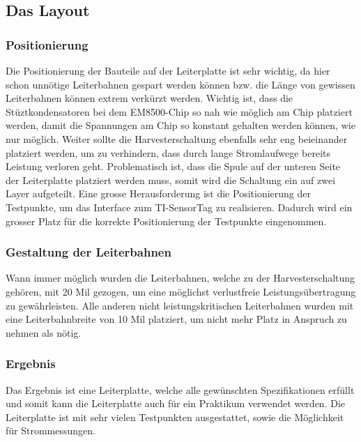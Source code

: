 \subsection{Das Layout}

\subsubsection{Positionierung}
Die Positionierung der Bauteile auf der Leiterplatte ist sehr wichtig, da hier schon unnötige Leiterbahnen gespart werden können bzw. die Länge von gewissen Leiterbahnen können extrem verkürzt werden.
Wichtig ist, dass die Stüztkondensatoren bei dem EM8500-Chip so nah wie möglich am Chip platziert werden, damit die Spannungen am Chip so konstant gehalten werden können, wie nur möglich.
Weiter sollte die Harvesterschaltung ebenfalls sehr eng beieinander platziert werden, um zu verhindern, dass durch lange Stromlaufwege bereits Leistung verloren geht. Problematisch ist, dass die Spule auf der unteren Seite der Leiterplatte platziert werden muss, somit wird die Schaltung ein auf zwei Layer aufgeteilt.
Eine grosse Herausforderung ist die Positionierung der Testpunkte, um das Interface zum TI-SensorTag zu realisieren. Dadurch wird ein grosser Platz für die korrekte Positionierung der Testpunkte eingenommen.

\subsubsection{Gestaltung der Leiterbahnen}

Wann immer möglich wurden die Leiterbahnen, welche zu der Harvesterschaltung gehören, mit 20 Mil gezogen, um eine möglichst verlustfreie Leistungsübertragung zu gewährleisten. Alle anderen nicht leistungskritischen Leiterbahnen wurden mit eine Leiterbahnbreite von 10 Mil platziert, um nicht mehr Platz in Anspruch zu nehmen als nötig.

\subsubsection{Ergebnis}

Das Ergebnis ist eine Leiterplatte, welche alle gewünschten Spezifikationen erfüllt und somit kann die Leiterplatte auch für ein Praktikum verwendet werden. Die Leiterplatte ist mit sehr vielen Testpunkten ausgestattet, sowie die Möglichkeit für Strommessungen.


